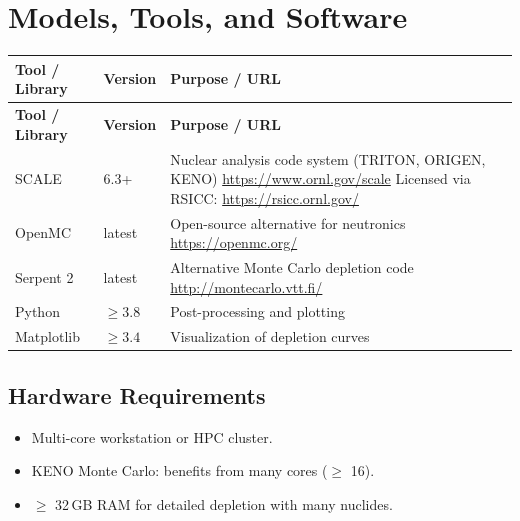 \documentclass[11pt,a4paper]{article}
\begin{document}
\section{Models, Tools, and Software}

\begin{longtable}{p{4.5cm} p{2.5cm} p{6.5cm}}
\toprule
\textbf{Tool / Library} & \textbf{Version} & \textbf{Purpose / URL} \\
\midrule
\endfirsthead
\toprule
\textbf{Tool / Library} & \textbf{Version} & \textbf{Purpose / URL} \\
\midrule
\endhead
SCALE & 6.3+ & Nuclear analysis code system (TRITON, ORIGEN, KENO) \newline \url{https://www.ornl.gov/scale} \newline Licensed via RSICC: \url{https://rsicc.ornl.gov/} \\
\midrule
OpenMC & latest & Open-source alternative for neutronics \newline \url{https://openmc.org/} \\
\midrule
Serpent 2 & latest & Alternative Monte Carlo depletion code \newline \url{http://montecarlo.vtt.fi/} \\
\midrule
Python & $\geq 3.8$ & Post-processing and plotting \\
\midrule
Matplotlib & $\geq 3.4$ & Visualization of depletion curves \\
\bottomrule
\end{longtable}

\subsection{Hardware Requirements}
\begin{itemize}
  \item Multi-core workstation or HPC cluster.
  \item KENO Monte Carlo: benefits from many cores ($\geq$ 16).
  \item $\geq$ 32\,GB RAM for detailed depletion with many nuclides.
\end{itemize}
\end{document}
